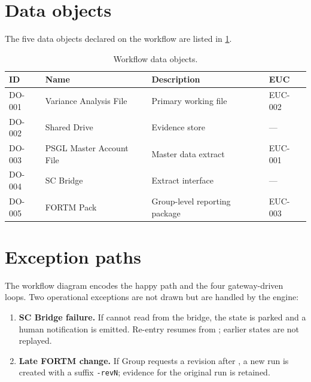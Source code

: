 \section{Data objects}

The five data objects declared on the workflow are listed in
\cref{tab:dataobjects}.

\begin{table}[htbp]
\caption{Workflow data objects.}\label{tab:dataobjects}
\centering
\small
\begin{tabularx}{\linewidth}{@{}llXl@{}}
\toprule
\textbf{ID} & \textbf{Name} & \textbf{Description} & \textbf{EUC} \\ \midrule
DO-001 & Variance Analysis File   & Primary working file              & EUC-002 \\
DO-002 & Shared Drive             & Evidence store                    & ---     \\
DO-003 & PSGL Master Account File & Master data extract               & EUC-001 \\
DO-004 & SC Bridge                & Extract interface                 & ---     \\
DO-005 & FORTM Pack               & Group-level reporting package     & EUC-003 \\
\bottomrule
\end{tabularx}
\end{table}

\section{Exception paths}

The workflow diagram encodes the happy path and the four
gateway-driven loops. Two operational exceptions are not drawn but
are handled by the engine:

\begin{enumerate}
  \item \textbf{SC Bridge failure.} If  cannot
        read from the bridge, the state is parked and a human
        notification is emitted. Re-entry resumes from
        ; earlier states are not replayed.
  \item \textbf{Late FORTM change.} If Group requests a revision after
        , a new run is created with a suffix
        \texttt{-revN}; evidence for the original run is retained.
\end{enumerate}
